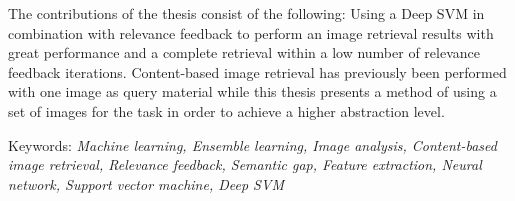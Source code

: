 The contributions of the thesis consist of the following: Using a Deep SVM in combination with relevance feedback to perform an image retrieval results with great performance and a complete retrieval within a low number of relevance feedback iterations. Content-based image retrieval has previously been performed with one image as query material while this thesis presents a method of using a set of images for the task in order to achieve a higher abstraction level. 

\vfill
Keywords: \textit{Machine learning, Ensemble learning, Image analysis, Content-based image retrieval, Relevance feedback, Semantic gap, Feature extraction, Neural network, Support vector machine, Deep SVM}

\thispagestyle{empty}
\mbox{}
